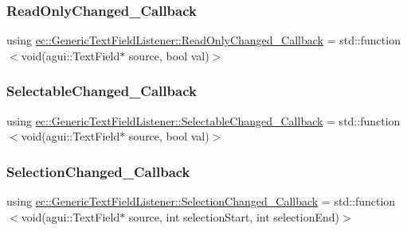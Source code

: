 \subsubsection{\texorpdfstring{Read\+Only\+Changed\+\_\+\+Callback}{ReadOnlyChanged\_Callback}}
{\footnotesize\ttfamily using \mbox{\hyperlink{classec_1_1_generic_text_field_listener_aca96f31990936c2284b510bc4636b08b}{ec\+::\+Generic\+Text\+Field\+Listener\+::\+Read\+Only\+Changed\+\_\+\+Callback}} =  std\+::function$<$void(agui\+::\+Text\+Field$\ast$ source, bool val)$>$}

\mbox{\label{classec_1_1_generic_text_field_listener_afa761f962b7fb681d7d9d29a132f800e}} 
\subsubsection{\texorpdfstring{Selectable\+Changed\+\_\+\+Callback}{SelectableChanged\_Callback}}
{\footnotesize\ttfamily using \mbox{\hyperlink{classec_1_1_generic_text_field_listener_afa761f962b7fb681d7d9d29a132f800e}{ec\+::\+Generic\+Text\+Field\+Listener\+::\+Selectable\+Changed\+\_\+\+Callback}} =  std\+::function$<$void(agui\+::\+Text\+Field$\ast$ source, bool val)$>$}

\mbox{\label{classec_1_1_generic_text_field_listener_aa25985c5297422833dc4f5395562f238}} 
\subsubsection{\texorpdfstring{Selection\+Changed\+\_\+\+Callback}{SelectionChanged\_Callback}}
{\footnotesize\ttfamily using \mbox{\hyperlink{classec_1_1_generic_text_field_listener_aa25985c5297422833dc4f5395562f238}{ec\+::\+Generic\+Text\+Field\+Listener\+::\+Selection\+Changed\+\_\+\+Callback}} =  std\+::function$<$void(agui\+::\+Text\+Field$\ast$ source, int selection\+Start, int selection\+End)$>$}



